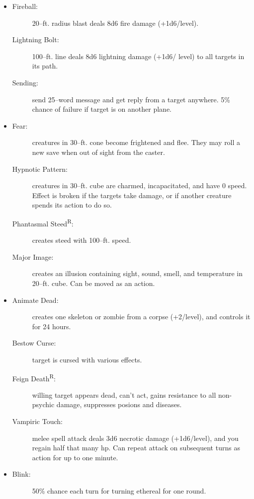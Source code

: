 \documentclass[DIV=14, paper=a4, fontsize=10pt, twocolumn, twoside]{scrartcl}
\begin{document}
\begin{itemize}[align=parleft,labelwidth=1cm]
\begin{description}
\end{description}
\renewcommand{\labelitemi}{Evoc}\item
\begin{description}
 \item[Fireball:] 20–ft. radius blast deals 8d6 fire damage (+1d6/level).
 \item[Lightning Bolt:] 100–ft. line deals 8d6 lightning damage (+1d6/ level) to all targets in its path.
 \item[Sending:] send 25–word message and get reply from a target anywhere. 5\% chance of failure if target is on another plane.
\end{description}
\renewcommand{\labelitemi}{Illus}\item
\begin{description}
 \item[Fear:] creatures in 30–ft. cone become frightened and flee. They may roll a new save when out of sight from the caster.
 \item[Hypnotic Pattern:] creatures in 30–ft. cube are charmed, incapacitated, and have 0 speed. Effect is broken if the targets take damage, or if another creature spends its action to do so.
 \item[Phantasmal Steed\textsuperscript{R}:] creates steed with 100–ft. speed.
 \item[Major Image:] creates an illusion containing sight, sound, smell, and temperature in 20–ft. cube. Can be moved as an action.
\end{description}
\renewcommand{\labelitemi}{Necro}\item
\begin{description}
 \item[Animate Dead:] creates one skeleton or zombie from a corpse (+2/level), and controls it for 24 hours.
 \item[Bestow Curse:] target is cursed with various effects.
 \item[Feign Death\textsuperscript{R}:] willing target appears dead, can’t act, gains resistance to all non-psychic damage, suppresses posions and diseases.
 \item[Vampiric Touch:] melee spell attack deals 3d6 necrotic damage (+1d6/level), and you regain half that many hp. Can repeat attack on subsequent turns as action for up to one minute.
\end{description}
\renewcommand{\labelitemi}{Trans}\item
\begin{description}
 \item[Blink:] 50\% chance each turn for turning ethereal for one round.

\end{description}
\end{itemize}
\end{document}
